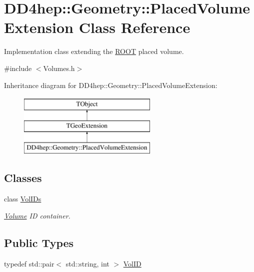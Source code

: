 \hypertarget{class_d_d4hep_1_1_geometry_1_1_placed_volume_extension}{}\section{D\+D4hep\+:\+:Geometry\+:\+:Placed\+Volume\+Extension Class Reference}
\label{class_d_d4hep_1_1_geometry_1_1_placed_volume_extension}


Implementation class extending the \hyperlink{namespace_r_o_o_t}{R\+O\+OT} placed volume.  




{\ttfamily \#include $<$Volumes.\+h$>$}

Inheritance diagram for D\+D4hep\+:\+:Geometry\+:\+:Placed\+Volume\+Extension\+:\begin{figure}[H]
\begin{center}
\leavevmode
\includegraphics[height=3.000000cm]{class_d_d4hep_1_1_geometry_1_1_placed_volume_extension}
\end{center}
\end{figure}
\subsection*{Classes}
\begin{DoxyCompactItemize}
\item 
class \hyperlink{class_d_d4hep_1_1_geometry_1_1_placed_volume_extension_1_1_vol_i_ds}{Vol\+I\+Ds}
\begin{DoxyCompactList}\small\item\em \hyperlink{class_d_d4hep_1_1_geometry_1_1_volume}{Volume} ID container. \end{DoxyCompactList}\end{DoxyCompactItemize}
\subsection*{Public Types}
\begin{DoxyCompactItemize}
\item 
typedef std\+::pair$<$ std\+::string, int $>$ \hyperlink{class_d_d4hep_1_1_geometry_1_1_placed_volume_extension_a9f0e95dedfbda206b118af985b2ed473}{Vol\+ID}
\end{DoxyCompactItemize}
